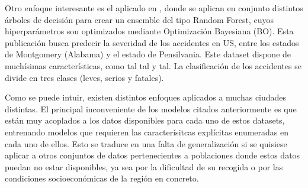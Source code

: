 \documentclass{uathesis-es}
\begin{document}
Otro enfoque interesante es el aplicado en \cite{su14031729}, donde se aplican en conjunto distintos árboles de decisión para crear un ensemble del tipo Random Forest, cuyos hiperparámetros son optimizados mediante Optimización Bayesiana (BO). Esta publicación busca predecir la severidad de los accidentes en US, entre los estados de Montgomery (Alabama) y el estado de Pensilvania. Este dataset dispone de muchísimas características, como tal tal y tal. La clasificación de los accidentes se divide en tres clases (leves, serios y fatales).

Como se puede intuir, existen distintos enfoques aplicados a muchas ciudades distintas. El principal inconveniente de los modelos citados anteriormente es que están muy acoplados a los datos disponibles para cada uno de estos datasets, entrenando modelos que requieren las caracterísitcas explícitas enumeradas en cada uno de ellos. Esto se traduce en una falta de generalización si se quisiese aplicar a otros conjuntos de datos pertenecientes a poblaciones donde estos datos puedan no estar disponibles, ya sea por la dificultad de su recogida o por las condiciones socioeconómicas de la región en concreto.











\end{document}
